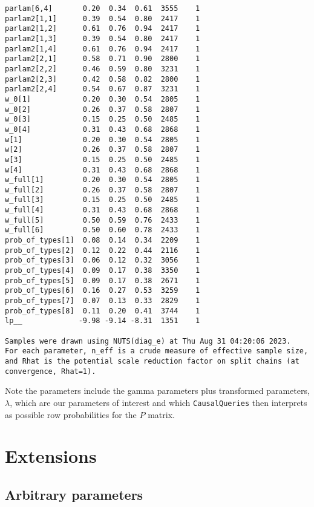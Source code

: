 \documentclass[
  12pt,
]{book}
\begin{document}
\begin{verbatim}
parlam[6,4]       0.20  0.34  0.61  3555    1
parlam2[1,1]      0.39  0.54  0.80  2417    1
parlam2[1,2]      0.61  0.76  0.94  2417    1
parlam2[1,3]      0.39  0.54  0.80  2417    1
parlam2[1,4]      0.61  0.76  0.94  2417    1
parlam2[2,1]      0.58  0.71  0.90  2800    1
parlam2[2,2]      0.46  0.59  0.80  3231    1
parlam2[2,3]      0.42  0.58  0.82  2800    1
parlam2[2,4]      0.54  0.67  0.87  3231    1
w_0[1]            0.20  0.30  0.54  2805    1
w_0[2]            0.26  0.37  0.58  2807    1
w_0[3]            0.15  0.25  0.50  2485    1
w_0[4]            0.31  0.43  0.68  2868    1
w[1]              0.20  0.30  0.54  2805    1
w[2]              0.26  0.37  0.58  2807    1
w[3]              0.15  0.25  0.50  2485    1
w[4]              0.31  0.43  0.68  2868    1
w_full[1]         0.20  0.30  0.54  2805    1
w_full[2]         0.26  0.37  0.58  2807    1
w_full[3]         0.15  0.25  0.50  2485    1
w_full[4]         0.31  0.43  0.68  2868    1
w_full[5]         0.50  0.59  0.76  2433    1
w_full[6]         0.50  0.60  0.78  2433    1
prob_of_types[1]  0.08  0.14  0.34  2209    1
prob_of_types[2]  0.12  0.22  0.44  2116    1
prob_of_types[3]  0.06  0.12  0.32  3056    1
prob_of_types[4]  0.09  0.17  0.38  3350    1
prob_of_types[5]  0.09  0.17  0.38  2671    1
prob_of_types[6]  0.16  0.27  0.53  3259    1
prob_of_types[7]  0.07  0.13  0.33  2829    1
prob_of_types[8]  0.11  0.20  0.41  3744    1
lp__             -9.98 -9.14 -8.31  1351    1

Samples were drawn using NUTS(diag_e) at Thu Aug 31 04:20:06 2023.
For each parameter, n_eff is a crude measure of effective sample size,
and Rhat is the potential scale reduction factor on split chains (at 
convergence, Rhat=1).
\end{verbatim}

Note the parameters include the gamma parameters plus transformed parameters, \(\lambda\), which are our parameters of interest and which \texttt{CausalQueries} then interprets as possible row probabilities for the \(P\) matrix.

\hypertarget{extensions}{%
\section{Extensions}\label{extensions}}

\hypertarget{arbitrary-parameters}{%
\subsection{Arbitrary parameters}\label{arbitrary-parameters}}
\end{document}
